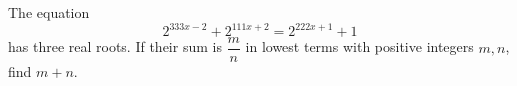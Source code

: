 The equation
\[
2^{333x-2}+2^{111x+2}=2^{222x+1}+1
\]
has three real roots. If their sum is $\dfrac{m}{n}$ in lowest terms with positive integers $m,n$, find $m+n$.
